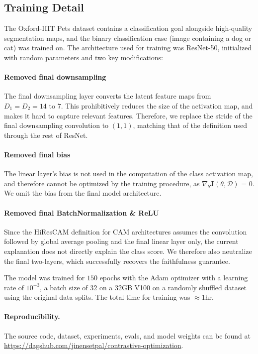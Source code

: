 \documentclass{article}
\begin{document}
\subsection{Training Detail}

The Oxford-IIIT Pets dataset contains a classification goal alongside high-quality segmentation maps, and the binary classification case (image containing a dog or cat) was trained on. The architecture used for training was ResNet-50, initialized with random parameters and two key modifications:

\paragraph{Removed final downsampling} The final downsampling layer converts the latent feature maps from $D_1 = D_2 = 14$ to $7$. This prohibitively reduces the size of the activation map, and makes it hard to capture relevant features. Therefore, we replace the stride of the final downsampling convolution to $(1,1)$, matching that of the definition used through the rest of ResNet. 

\paragraph{Removed final bias} The linear layer's bias is not used in the computation of the class activation map, and therefore cannot be optimized by the training procedure, as $\nabla_b \mathcal{\bm{J}}(\theta, \mathcal{D})$ = 0. We omit the bias from the final model architecture.

\paragraph{Removed final BatchNormalization \& ReLU} Since the HiResCAM definition for CAM architectures assumes the convolution followed by global average pooling and the final linear layer only, the current explanation does not directly explain the class score. We therefore also neutralize the final two-layers, which successfully recovers the faithfulness guarantee.

The model was trained for $150$ epochs with the Adam optimizer with a learning rate of $10^{-3}$, a batch size of $32$ on a 32GB V100 on a randomly shuffled dataset using the original data splits. The total time for training was $\approx$1hr.

\paragraph{Reproducibility.} The source code, dataset, experiments, evals, and model weights can be found at \url{https://dagshub.com/jinensetpal/contrastive-optimization}.
\end{document}
